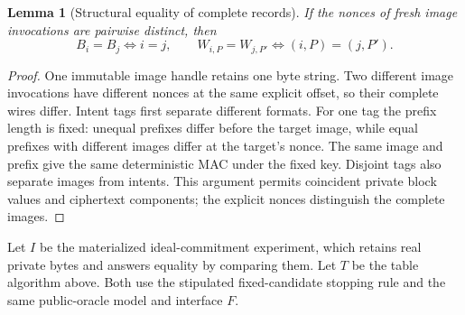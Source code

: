 \documentclass[pdflatex]{sn-jnl}
\theoremstyle{thmstyleone}
\newtheorem{lemma}[theorem]{Lemma}
\theoremstyle{thmstylethree}
\theoremstyle{thmstyletwo}
\begin{document}
\begin{lemma}[Structural equality of complete records]
\label{lem:record-structural-equality}
If the nonces of fresh image invocations are pairwise distinct, then
\[
 B_i=B_j\iff i=j,\qquad
 W_{i,P}=W_{j,P'}\iff(i,P)=(j,P').
\]
\end{lemma}
\begin{proof}
One immutable image handle retains one byte string. Two different image
invocations have different nonces at the same explicit offset, so their
complete wires differ. Intent tags first separate different formats. For
one tag the prefix length is fixed: unequal prefixes differ before the
target image, while equal prefixes with different images differ at the
target's nonce. The same image and prefix give the same deterministic MAC
under the fixed key. Disjoint tags also separate images from intents.
This argument permits coincident private block values and ciphertext
components; the explicit nonces distinguish the complete images.
\end{proof}

Let $I$ be the materialized ideal-commitment experiment, which retains real
private bytes and answers equality by comparing them. Let $T$ be the table
algorithm above. Both use the stipulated fixed-candidate stopping rule and
the same public-oracle model and interface $F$.
\end{document}
